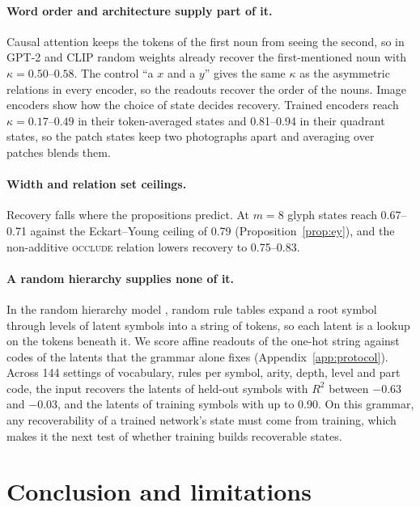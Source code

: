 \documentclass[10pt]{article}
\theoremstyle{plain}
\theoremstyle{remark}
\begin{document}
\paragraph{Word order and architecture supply part of it.} Causal attention keeps the tokens of the first noun from seeing the second, so in GPT-2 and CLIP random weights already recover the first-mentioned noun with $\kappa = 0.50$--$0.58$. The control ``a $x$ and a $y$'' gives the same $\kappa$ as the asymmetric relations in every encoder, so the readouts recover the order of the nouns. Image encoders show how the choice of state decides recovery. Trained encoders reach $\kappa = 0.17$--$0.49$ in their token-averaged states and 0.81--0.94 in their quadrant states, so the patch states keep two photographs apart and averaging over patches blends them.

\paragraph{Width and relation set ceilings.} Recovery falls where the propositions predict. At $m = 8$ glyph states reach 0.67--0.71 against the Eckart--Young ceiling of 0.79 (Proposition~\ref{prop:ey}), and the non-additive \textsc{occlude} relation lowers recovery to 0.75--0.83.

\paragraph{A random hierarchy supplies none of it.} In the random hierarchy model \citep{cagnetta2024rhm}, random rule tables expand a root symbol through levels of latent symbols into a string of tokens, so each latent is a lookup on the tokens beneath it. We score affine readouts of the one-hot string against codes of the latents that the grammar alone fixes (Appendix~\ref{app:protocol}). Across 144 settings of vocabulary, rules per symbol, arity, depth, level and part code, the input recovers the latents of held-out symbols with $R^2$ between $-0.63$ and $-0.03$, and the latents of training symbols with up to 0.90. On this grammar, any recoverability of a trained network's state must come from training, which makes it the next test of whether training builds recoverable states.

\section{Conclusion and limitations}
\label{sec:discussion}
\end{document}
